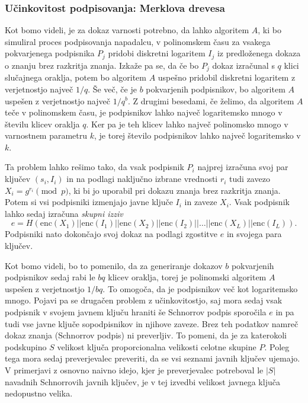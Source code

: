 \subsubsection{Učinkovitost podpisovanja: Merklova drevesa}
Kot bomo videli, je za dokaz varnosti potrebno, da lahko algoritem $A$, ki bo simuliral
proces podpisovanja napadalcu, v polinomskem času za vsakega pokvarjenega podpisnika $P_j$ pridobi
diskretni logaritem $I_j$ iz predloženega dokaza o znanju brez razkritja znanja. Izkaže pa se, da če
bo $P_j$ dokaz izračunal s $q$ klici slučajnega oraklja, potem bo algoritem $A$ uspešno
pridobil diskretni logaritem z verjetnostjo največ $1/q$. Še več, če je $b$ pokvarjenih podpisnikov,
bo algoritem $A$ uspešen z verjetnostjo največ $1/q^b$. Z drugimi besedami, če želimo,
da algoritem $A$ teče v polinomskem času, je podpisnikov lahko največ logaritemsko mnogo v
številu klicev oraklja $q$. Ker pa je teh klicev lahko največ polinomsko mnogo v varnostnem parametru
$k$, je torej število podpisnikov lahko največ logaritemsko v $k$.

Ta problem lahko rešimo tako, da vsak podpisnik $P_i$ najprej izračuna svoj par ključev $(s_i, I_i)$
in na podlagi naključno izbrane vrednosti $r_i$ tudi zavezo $X_i = g^{r_i} \pmod p$, ki bi jo uporabil
pri dokazu znanja brez razkritja znanja. Potem si vsi podpisniki izmenjajo javne ključe $I_i$ in
zaveze $X_i$. Vsak podpisnik lahko sedaj izračuna \textit{skupni izziv}
$$
e = H(\text{enc}(X_1) || \text{enc}(I_1) || \text{enc}(X_2) || \text{enc}(I_2) || \dots || \text{enc}(X_L) || \text{enc}(I_L)).
$$
Podpisniki nato dokončajo svoj dokaz na podlagi zgostitve $e$ in svojega para ključev.

Kot bomo videli, bo to pomenilo, da za generiranje dokazov $b$ pokvarjenih podpisnikov sedaj rabi le
$bq$ klicev oraklja, torej je polinomski algoritem $A$ uspešen z verjetnostjo $1/bq$. To
omogoča, da je podpisnikov več kot logaritemsko mnogo. Pojavi pa se drugačen problem z učinkovitostjo,
saj mora sedaj vsak podpisnik v svojem javnem ključu hraniti še Schnorrov podpis sporočila $e$ in pa
tudi vse javne ključe sopodpisnikov in njihove zaveze. Brez teh podatkov namreč dokaz znanja (Schnorrov
podpis) ni preverljiv. To pomeni, da je za katerokoli podskupino $S$ velikost ključa proporcionalna
velikosti celotne skupine $P$. Poleg tega mora sedaj preverjevalec preveriti, da se vsi seznami javnih
ključev ujemajo. V primerjavi z osnovno naivno idejo, kjer je preverjevalec potreboval le $|S|$ navadnih
Schnorrovih javnih ključev, je v tej izvedbi velikost javnega ključa nedopustno velika.

